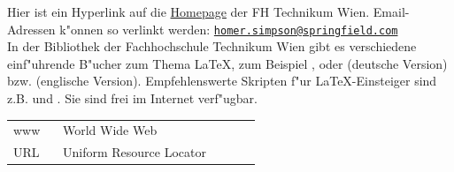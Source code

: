 \documentclass[a4paper,bibtotoc,oneside]{scrbook}
\begin{document}
\noindent
Hier ist ein Hyperlink auf die  \href{http://www.technikum-wien.at}{Homepage} der FH Technikum Wien. Email-Adressen k"onnen so verlinkt werden: \href{mailto:homer.simpson@springfield.com}{\texttt{homer.simpson@springfield.com}}\\

\noindent
In der Bibliothek der Fachhochschule Technikum Wien gibt es verschiedene einf"uhrende B"ucher zum Thema \glqq \LaTeX \grqq, zum Beispiel \cite{kop05}, \cite{wil06} oder \cite{mgb+05d} (deutsche Version) bzw. \cite{mgb+04e} (englische Version). Empfehlenswerte Skripten f"ur \LaTeX-Einsteiger sind z.B. \cite{mj00} und \cite{mj95}. Sie sind frei im Internet verf"ugbar.






\listoffigures
{} %
\newpage

\listoftables 
{} %
\newpage

\hspace{-17mm}\begin{tabular}{>{\raggedleft}p{0.2\linewidth} p{0.75\linewidth} p{0.1\linewidth}}
www & World Wide Web \\
URL & Uniform Resource Locator
\end{tabular}
\end{document}
